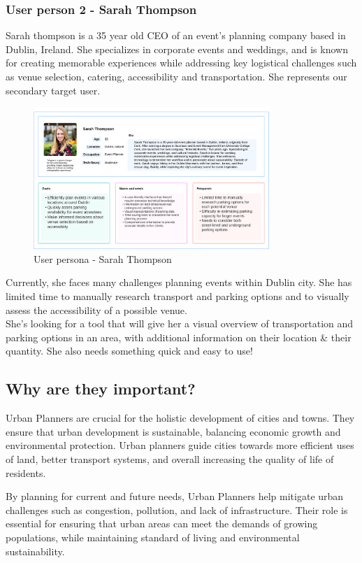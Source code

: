 \subsubsection{User person 2 - Sarah Thompson}
Sarah thompson is a 35 year old CEO of an event's planning company based in Dublin, Ireland. She specializes in corporate events and weddings, and is known for creating memorable experiences while addressing key logistical challenges such as venue selection, catering, accessibility and transportation. She represents our secondary target user.
\begin{figure}[h!]
    \centering
    \includegraphics[width=0.8\textwidth]{images/sarah-thompson-userpersona.png}
    \caption{User persona - Sarah Thompson}
\end{figure}
Currently, she faces many challenges planning events within Dublin city. She has limited time to manually research transport and parking options and to visually assess the accessibility of a possible venue.\\
She's looking for a tool that will give her a visual overview of transportation and parking options in an area, with additional information on their location  \& their quantity. She also needs something quick and easy to use!\\

\subsection{Why are they important?}
Urban Planners are crucial for the holistic development of cities and towns.
They ensure that urban development is sustainable, balancing economic growth and
environmental protection. Urban planners guide cities towards more efficient
uses of land, better transport systems, and overall increasing the quality of
life of residents.

By planning for current and future needs, Urban Planners help mitigate urban
challenges such as congestion, pollution, and lack of infrastructure. Their role
is essential for ensuring that urban areas can meet the demands of growing
populations, while maintaining standard of living and environmental
sustainability.

